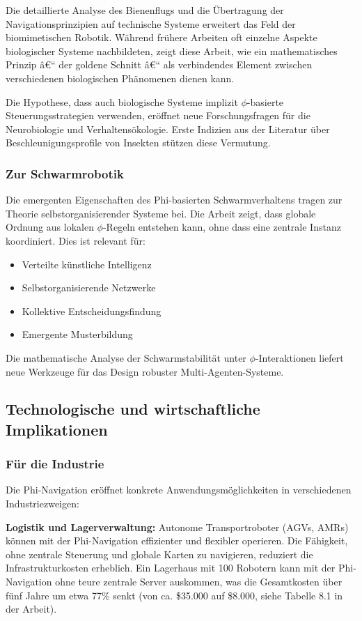 ﻿\documentclass[a4paper,12pt]{article}
\theoremstyle{definition}
\begin{document}
Die detaillierte Analyse des Bienenflugs und die Übertragung der Navigationsprinzipien auf technische Systeme erweitert das Feld der biomimetischen Robotik. Während frühere Arbeiten oft einzelne Aspekte biologischer Systeme nachbildeten, zeigt diese Arbeit, wie ein mathematisches Prinzip â€“ der goldene Schnitt â€“ als verbindendes Element zwischen verschiedenen biologischen Phänomenen dienen kann.

Die Hypothese, dass auch biologische Systeme implizit $\phi$-basierte Steuerungsstrategien verwenden, eröffnet neue Forschungsfragen für die Neurobiologie und Verhaltensökologie. Erste Indizien aus der Literatur über Beschleunigungsprofile von Insekten stützen diese Vermutung.

\subsubsection{Zur Schwarmrobotik}

Die emergenten Eigenschaften des Phi-basierten Schwarmverhaltens tragen zur Theorie selbstorganisierender Systeme bei. Die Arbeit zeigt, dass globale Ordnung aus lokalen $\phi$-Regeln entstehen kann, ohne dass eine zentrale Instanz koordiniert. Dies ist relevant für:
\begin{itemize}
	\item Verteilte künstliche Intelligenz
	\item Selbstorganisierende Netzwerke
	\item Kollektive Entscheidungsfindung
	\item Emergente Musterbildung
\end{itemize}

Die mathematische Analyse der Schwarmstabilität unter $\phi$-Interaktionen liefert neue Werkzeuge für das Design robuster Multi-Agenten-Systeme.

\subsection{Technologische und wirtschaftliche Implikationen}

\subsubsection{Für die Industrie}

Die Phi-Navigation eröffnet konkrete Anwendungsmöglichkeiten in verschiedenen Industriezweigen:

\textbf{Logistik und Lagerverwaltung:} Autonome Transportroboter (AGVs, AMRs) können mit der Phi-Navigation effizienter und flexibler operieren. Die Fähigkeit, ohne zentrale Steuerung und globale Karten zu navigieren, reduziert die Infrastrukturkosten erheblich. Ein Lagerhaus mit 100 Robotern kann mit der Phi-Navigation ohne teure zentrale Server auskommen, was die Gesamtkosten über fünf Jahre um etwa 77\% senkt (von ca. \$35.000 auf \$8.000, siehe Tabelle 8.1 in der Arbeit).
\end{document}
